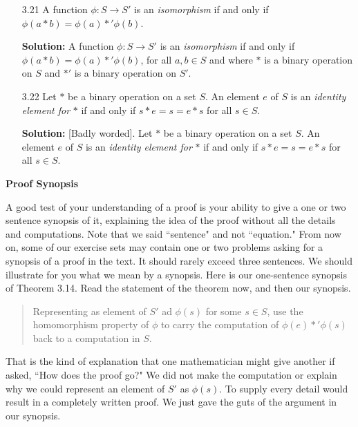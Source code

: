 \begin{enumerate}
   \item[3.21] A function $\phi : S \rightarrow S'$ is an \textit{isomorphism}
               if and only if $\phi(a * b) = \phi(a) *' \phi(b)$.

      \textbf{Solution:} A function $\phi : S \rightarrow S'$ is an
      \textit{isomorphism} if and only if $\phi(a * b) = \phi(a) *' \phi(b)$,
      for all $a, b \in S$ and where $*$ is a binary operation on $S$ and $*'$
      is a binary operation on $S'$.
   \item[3.22] Let $*$ be a binary operation on a set $S$. An element $e$ of $S$
               is an \textit{identity element for} $*$ if and only if
               $s * e = s = e * s$ for all $s \in S$.

      \textbf{Solution:} [Badly worded]. Let $*$ be a binary operation on a set
      $S$. An element $e$ of $S$ is an \textit{identity element for} $*$ if and
      only if $s * e = s = e * s$ for all $s \in S$.

\end{enumerate}

\noindent \textbf{Proof Synopsis}

\noindent A good test of your understanding of a proof is your ability to give
          a one or two sentence synopsis of it, explaining the idea of the 
          proof without all the details and computations. Note that we said 
          ``sentence" and not ``equation." From now on, some of our exercise 
          sets may contain one or two problems asking for a synopsis of a proof 
          in the text. It should rarely exceed three sentences. We should
          illustrate for you what we mean by a synopsis. Here is our
          one-sentence synopsis of Theorem 3.14. Read the statement of the
          theorem now, and then our synopsis.
          \begin{quote}
             Representing as element of $S'$ ad $\phi(s)$ for some $s \in S$, 
             use the homomorphism property of $\phi$ to carry the computation of
             $\phi(e) *' \phi(s)$ back to a computation in $S$.
          \end{quote}

          That is the kind of explanation that one mathematician might give
          another if asked,   ``How does the proof go?" We did not make the
          computation or explain why we could represent an element of $S'$ as
          $\phi(s)$. To supply every detail would result in a completely written
          proof. We just gave the guts of the argument in our synopsis.

